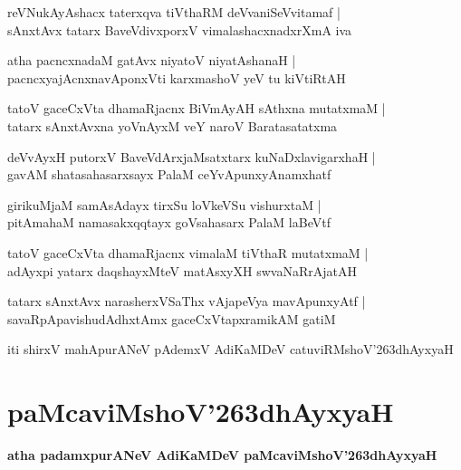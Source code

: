 \documentclass[twoside,12pt,openright]{book}
\def\S{\char'263}
\newcounter{shloka}[chapter]
\begin{document}
\begin{shloka}
reVNukAyAshacx taterxqva tiVthaRM deVvaniSeVvitamaf |\\
sAnxtAvx tatarx BaveVdivxporxV vimalashacxnadxrXmA iva 
\end{shloka}

\begin{shloka}
atha pacncxnadaM gatAvx niyatoV niyatAshanaH |\\
pacncxyajAcnxnavAponxVti karxmashoV yeV tu kiVtiRtAH 
\end{shloka}

\begin{shloka}
tatoV gaceCxVta dhamaRjacnx BiVmAyAH sAthxna mutatxmaM |\\
tatarx sAnxtAvxna yoVnAyxM veY naroV Baratasatatxma 
\end{shloka}

\begin{shloka}
deVvAyxH putorxV BaveVdArxjaMsatxtarx kuNaDxlavigarxhaH |\\
gavAM shatasahasarxsayx PalaM ceYvApunxyAnamxhatf 
\end{shloka}

\begin{shloka}
girikuMjaM samAsAdayx tirxSu loVkeVSu vishurxtaM |\\
pitAmahaM namasakxqqtayx goVsahasarx PalaM laBeVtf 
\end{shloka}

\begin{shloka}
tatoV gaceCxVta dhamaRjacnx vimalaM tiVthaR mutatxmaM |\\
adAyxpi yatarx daqshayxMteV matAsxyXH swvaNaRrAjatAH 
\end{shloka}

\begin{shloka}
tatarx sAnxtAvx narasherxVSaThx vAjapeVya mavApunxyAtf |\\
savaRpApavishudAdhxtAmx gaceCxVtapxramikAM gatiM 
\end{shloka}

\begin{center}
iti shirxV mahApurANeV pAdemxV AdiKaMDeV catuviRMshoV\S dhAyxyaH 
\end{center}

\chapter{paMcaviMshoV\S dhAyxyaH}

\begin{center}
{\LARGE\bfseries atha padamxpurANeV AdiKaMDeV paMcaviMshoV\S dhAyxyaH}
\end{center}
\end{document}
